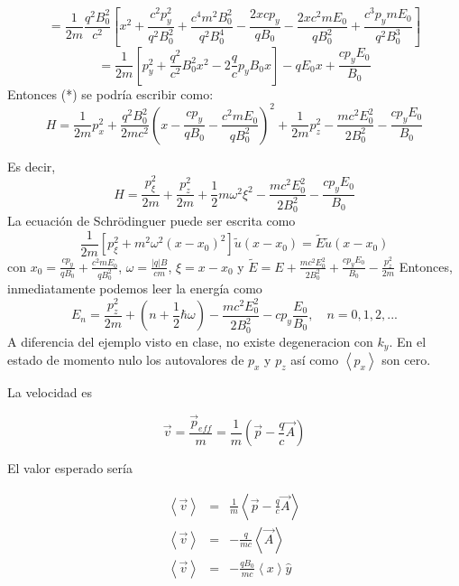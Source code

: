 \begin{solution}
\begin{equation*}
=\frac{1}{2m}\frac{q^2B_0^2}{c^2}[x^2+\frac{c^2p_y^2}{q^2B_0^2}+\frac{c^4m^2B_0^2}{q^2B_0^4}-\frac{2xcp_y}{qB_0}-\frac{2xc^2mE_0}{qB_0^2}+\frac{c^3p_ymE_0}{q^2B_0^3}]
\end{equation*}
\begin{equation*}
=\frac{1}{2m}[p_y^2+\frac{q^2}{c^2}B_0^2x^2-2\frac{q}{c}p_yB_0x]-qE_0x+\frac{cp_yE_0}{B_0}
\end{equation*}
Entonces  (*) se podría escribir como:
\begin{equation*}
H=\frac{1}{2m}p_x^2+\frac{q^2B_0^2}{2mc^2}(x-\frac{cp_y}{qB_0}-\frac{c^2mE_0}{qB_0^2})^2+\frac{1}{2m}p_z^2-\frac{mc^2E_0^2}{2B_0^2}-\frac{cp_yE_0}{B_0}
\end{equation*}

Es decir,
\begin{equation*}
H=\frac{p_\xi^2}{2m}+\frac{p_z^2}{2m}+\frac{1}{2}m\omega^2\xi^2-\frac{mc^2E_0^2}{2B_0^2}-\frac{cp_yE_0}{B_0}
\end{equation*}
La ecuación de Schrödinguer puede ser escrita como
\begin{equation*}
\frac{1}{2m}[p_\xi^2+m^2\omega^2(x-x_0)^2]\tilde{u}(x-x_0)=\tilde{E} \tilde{u}(x-x_0)
\end{equation*}
con $x_0=\frac{cp_y}{qB_0}+\frac{c^2mE_0}{qB_0^2}$, $\omega=\frac{ \left | q \right |  B }{cm}$, $\xi=x-x_0$ y $\tilde{E}=E+\frac{mc^2E_0^2}{2B_0^2}+\frac{cp_yE_0}{B_0}-\frac{p_z^2}{2m}$
Entonces, inmediatamente podemos leer la energía como
\begin{equation*}
E_n=\frac{p_z^2}{2m}+(n+\frac{1}{2}\hbar\omega)-\frac{mc^2E_0^2}{2B_0^2}-cp_y\frac{E_0}{B_0}, \quad n=0, 1, 2, ...
\end{equation*}
A diferencia del ejemplo visto en clase, no existe degeneracion con $k_y$.
En el estado de momento nulo los autovalores de $p_{x}$ y $p_{z}$
así como $\left\langle p_{x}\right\rangle $ son cero.

La velocidad es

\[
\vec{v}=\frac{\vec{p}_{eff}}{m}=\frac{1}{m}(\vec{p}-\frac{q}{c}\vec{A})
\]

El valor esperado sería

\begin{eqnarray*}
\left\langle \vec{v}\right\rangle  & = & \frac{1}{m}\left\langle \vec{p}-\frac{q}{c}\vec{A}\right\rangle \\
\left\langle \vec{v}\right\rangle  & = & -\frac{q}{mc}\left\langle \vec{A}\right\rangle \\
\left\langle \vec{v}\right\rangle  & = & -\frac{qB_{0}}{mc}\left\langle x\right\rangle \hat{y}
\end{eqnarray*}


\end{solution}
